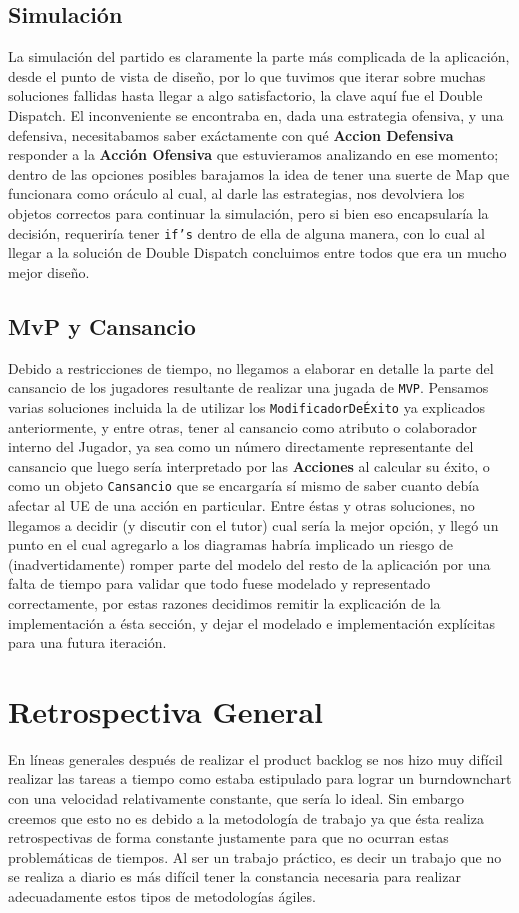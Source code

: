 \subsection{Simulación}

La simulación del partido es claramente la parte más complicada de la aplicación, desde el punto de vista de diseño, por lo que tuvimos que iterar sobre muchas soluciones fallidas hasta llegar a algo satisfactorio, la clave aquí fue el Double Dispatch. El inconveniente se encontraba en, dada una estrategia ofensiva, y una defensiva, necesitabamos saber exáctamente con qué \textbf{Accion Defensiva} responder a la \textbf{Acción Ofensiva} que estuvieramos analizando en ese momento; dentro de las opciones posibles barajamos la idea de tener una suerte de Map que funcionara como oráculo al cual, al darle las estrategias, nos devolviera los objetos correctos para continuar la simulación, pero si bien eso encapsularía la decisión, requeriría tener \texttt{if's} dentro de ella de alguna manera, con lo cual al llegar a la solución de Double Dispatch concluimos entre todos que era un mucho mejor diseño.

\subsection{MvP y Cansancio}

Debido a restricciones de tiempo, no llegamos a elaborar en detalle la parte del cansancio de los jugadores resultante de realizar una jugada de \texttt{MVP}. Pensamos varias soluciones incluida la de utilizar los \texttt{ModificadorDeÉxito} ya explicados anteriormente, y entre otras, tener al cansancio como atributo o colaborador interno del Jugador, ya sea como un número directamente representante del cansancio que luego sería interpretado por las \textbf{Acciones} al calcular su éxito, o como un objeto \texttt{Cansancio} que se encargaría sí mismo de saber cuanto debía afectar al UE de una acción en particular. Entre éstas y otras soluciones, no llegamos a decidir (y discutir con el tutor) cual sería la mejor opción, y llegó un punto en el cual agregarlo a los diagramas habría implicado un riesgo de (inadvertidamente) romper parte del modelo del resto de la aplicación por una falta de tiempo para validar que todo fuese modelado y representado correctamente, por estas razones decidimos remitir la explicación de la implementación a ésta sección, y dejar el modelado e implementación explícitas para una futura iteración.

\section{Retrospectiva General}
En líneas generales después de realizar el product backlog se nos hizo muy difícil
realizar las tareas a tiempo como estaba estipulado para lograr un burndownchart
con una velocidad relativamente constante, que sería lo ideal. 
Sin embargo creemos que esto no es debido a la metodología de trabajo ya que 
ésta realiza retrospectivas de forma constante justamente para que 
no ocurran estas problemáticas de tiempos.
Al ser un trabajo práctico, es decir un trabajo que no se realiza a diario 
es más difícil tener la constancia necesaria
para realizar adecuadamente estos tipos de metodologías ágiles.
